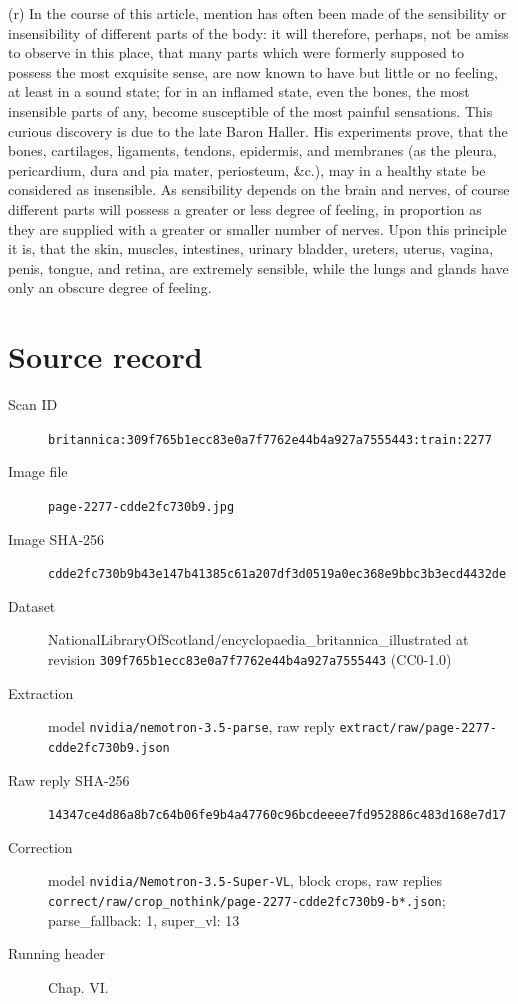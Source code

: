 \documentclass{article}
\begin{document}
(r) In the course of this article, mention has often been made of the sensibility or insensibility of different parts of the body: it will therefore, perhaps, not be amiss to observe in this place, that many parts which were formerly supposed to possess the most exquisite sense, are now known to have but little or no feeling, at least in a sound state; for in an inflamed state, even the bones, the most insensible parts of any, become susceptible of the most painful sensations. This curious discovery is due to the late Baron Haller. His experiments prove, that the bones, cartilages, ligaments, tendons, epidermis, and membranes (as the pleura, pericardium, dura and pia mater, periosteum, \&c.), may in a healthy state be considered as insensible. As sensibility depends on the brain and nerves, of course different parts will possess a greater or less degree of feeling, in proportion as they are supplied with a greater or smaller number of nerves. Upon this principle it is, that the skin, muscles, intestines, urinary bladder, ureters, uterus, vagina, penis, tongue, and retina, are extremely sensible, while the lungs and glands have only an obscure degree of feeling.


\section*{Source record}
\begin{description}
\item[Scan ID] \texttt{britannica:309f765b1ecc83e0a7f7762e44b4a927a7555443:train:2277}
\item[Image file] \texttt{page-2277-cdde2fc730b9.jpg}
\item[Image SHA-256] \texttt{cdde2fc730b9b43e147b41385c61a207df3d0519a0ec368e9bbc3b3ecd4432de}
\item[Dataset] NationalLibraryOfScotland/encyclopaedia\_britannica\_illustrated at revision \texttt{309f765b1ecc83e0a7f7762e44b4a927a7555443} (CC0-1.0)
\item[Extraction] model \texttt{nvidia/nemotron-3.5-parse}, raw reply \texttt{extract/raw/page-2277-cdde2fc730b9.json}
\item[Raw reply SHA-256] \texttt{14347ce4d86a8b7c64b06fe9b4a47760c96bcdeeee7fd952886c483d168e7d17}
\item[Correction] model \texttt{nvidia/Nemotron-3.5-Super-VL}, block crops, raw replies \texttt{correct/raw/crop\_nothink/page-2277-cdde2fc730b9-b*.json}; parse\_fallback: 1, super\_vl: 13
\item[Running header] Chap. VI.
\end{description}
\end{document}
